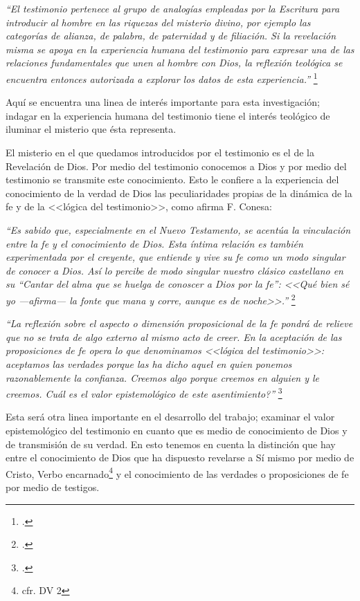 \documentclass[12pt]{article}
\begin{document}
{\emph{``El testimonio pertenece al grupo de analogías empleadas por la Escritura para introducir al hombre en las riquezas del misterio divino, por ejemplo las categorías de alianza, de palabra, de paternidad y de filiación. Si la revelación misma se apoya en la experiencia humana del testimonio para expresar una de las relaciones fundamentales que unen al hombre con Dios, la reflexión teológica se encuentra entonces autorizada a explorar los datos de esta experiencia.''
}
\footcite[p.~1523]{dicctf}

Aquí se encuentra una linea de interés importante para esta investigación; indagar en la experiencia humana del testimonio tiene el interés teológico de iluminar el misterio que ésta representa. 

El misterio en el que quedamos introducidos por el testimonio es el de la Revelación de Dios. Por medio del testimonio conocemos a Dios y por medio del testimonio se transmite este conocimiento. Esto le confiere a la experiencia del conocimiento de la verdad de Dios las peculiaridades propias de la dinámica de la fe y de la <<lógica del testimonio>>, como afirma F. Conesa:

\emph{
``Es sabido que, especialmente en el Nuevo Testamento, se acentúa la vinculación entre la fe y el conocimiento de Dios. Esta íntima relación es también experimentada por el creyente, que entiende y vive su fe como un modo singular de conocer a Dios. Así lo percibe de modo singular nuestro clásico castellano en su ``Cantar del alma que se huelga de conoscer a Dios por la fe'': <<Qué bien sé yo ---afirma--- la fonte que mana y corre, aunque es de noche>>.''}
\footcite[p.~15]{cyc}


\emph{
``La reflexión sobre el aspecto o dimensión proposicional de la fe pondrá de relieve que no se trata de algo externo al mismo acto de creer. En la aceptación de las proposiciones de fe opera lo que denominamos <<lógica del testimonio>>: aceptamos las verdades porque las ha dicho aquel en quien ponemos razonablemente la confianza. Creemos algo porque creemos en alguien y le creemos. \textquestiondown Cuál es el valor epistemológico de este asentimiento?''}
\footcite[p.483]{feylogicaconesa}

Esta será otra linea importante en el desarrollo del trabajo; examinar el valor epistemológico del testimonio en cuanto que es medio de conocimiento de Dios y de transmisión de su verdad. En esto tenemos en cuenta la distinción que hay entre el conocimiento de Dios que ha dispuesto revelarse a Sí mismo por medio de Cristo, Verbo encarnado\footnote{cfr. DV 2} y el conocimiento de las verdades o proposiciones de fe por medio de testigos. 

}
\end{document}
